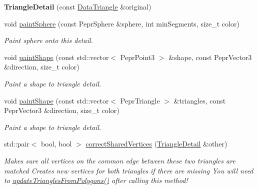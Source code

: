 \begin{DoxyCompactItemize}
\item 
\mbox{\label{classpepr3d_1_1_triangle_detail_a33380ae8d2798829b809316ceb653b4c}} 
{\bfseries Triangle\+Detail} (const \mbox{\hyperlink{classpepr3d_1_1_data_triangle}{Data\+Triangle}} \&original)
\item 
void \mbox{\hyperlink{classpepr3d_1_1_triangle_detail_a18e1da05e7fb8b50198a9152d238af85}{paint\+Sphere}} (const Pepr\+Sphere \&sphere, int min\+Segments, size\+\_\+t color)
\begin{DoxyCompactList}\small\item\em Paint sphere onto this detail. \end{DoxyCompactList}\item 
void \mbox{\hyperlink{classpepr3d_1_1_triangle_detail_a74eeb9464b6262f5d0b9ec2c8a0c4964}{paint\+Shape}} (const std\+::vector$<$ Pepr\+Point3 $>$ \&shape, const Pepr\+Vector3 \&direction, size\+\_\+t color)
\begin{DoxyCompactList}\small\item\em Paint a shape to triangle detail. \end{DoxyCompactList}\item 
void \mbox{\hyperlink{classpepr3d_1_1_triangle_detail_a7a2dc9dd17ebc6ec57e4598a9ce48bad}{paint\+Shape}} (const std\+::vector$<$ Pepr\+Triangle $>$ \&triangles, const Pepr\+Vector3 \&direction, size\+\_\+t color)
\begin{DoxyCompactList}\small\item\em Paint a shape to triangle detail. \end{DoxyCompactList}\item 
std\+::pair$<$ bool, bool $>$ \mbox{\hyperlink{classpepr3d_1_1_triangle_detail_a30215d8b668385e1f6c145545d9366f2}{correct\+Shared\+Vertices}} (\mbox{\hyperlink{classpepr3d_1_1_triangle_detail}{Triangle\+Detail}} \&other)
\begin{DoxyCompactList}\small\item\em Makes sure all vertices on the common edge between these two triangles are matched Creates new vertices for both triangles if there are missing You will need to \mbox{\hyperlink{classpepr3d_1_1_triangle_detail_a55836364f8bca5dce29da4a7320adf65}{update\+Triangles\+From\+Polygons()}} after calling this method! \end{DoxyCompactList}\item 
\mbox{\label{classpepr3d_1_1_triangle_detail_af71efedfe287618fc844fbd2b68b0082}} 

\end{DoxyCompactItemize}

